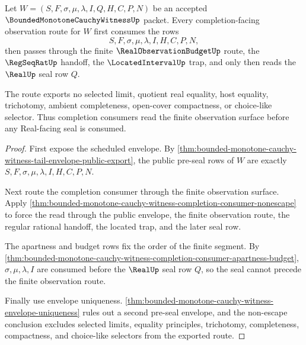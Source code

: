 \begin{theorem}
\label{thm:bounded-monotone-cauchy-witness-completion-observation-route}
Let $W=(S,F,\sigma,\mu,\lambda,I,Q,H,C,P,N)$ be an accepted $\BoundedMonotoneCauchyWitnessUp$ packet. Every completion-facing observation route for $W$ first consumes the rows
$$
S,F,\sigma,\mu,\lambda,I,H,C,P,N,
$$
then passes through the finite $\RealObservationBudgetUp$ route, the $\RegSeqRatUp$ handoff, the $\LocatedIntervalUp$ trap, and only then reads the $\RealUp$ seal row $Q$.

The route exports no selected limit, quotient real equality, host equality, trichotomy, ambient completeness, open-cover compactness, or choice-like selector. Thus completion consumers read the finite observation surface before any Real-facing seal is consumed.
\end{theorem}
\begin{proof}
First expose the scheduled envelope. By \autoref{thm:bounded-monotone-cauchy-witness-tail-envelope-public-export}, the public pre-seal rows of $W$ are exactly $S,F,\sigma,\mu,\lambda,I,H,C,P,N$.

Next route the completion consumer through the finite observation surface. Apply \autoref{thm:bounded-monotone-cauchy-witness-completion-consumer-nonescape} to force the read through the public envelope, the finite observation route, the regular rational handoff, the located trap, and the later seal row.

The apartness and budget rows fix the order of the finite segment. By \autoref{thm:bounded-monotone-cauchy-witness-completion-consumer-apartness-budget}, $\sigma,\mu,\lambda,I$ are consumed before the $\RealUp$ seal row $Q$, so the seal cannot precede the finite observation route.

Finally use envelope uniqueness. \autoref{thm:bounded-monotone-cauchy-witness-envelope-uniqueness} rules out a second pre-seal envelope, and the non-escape conclusion excludes selected limits, equality principles, trichotomy, completeness, compactness, and choice-like selectors from the exported route.
\end{proof}

